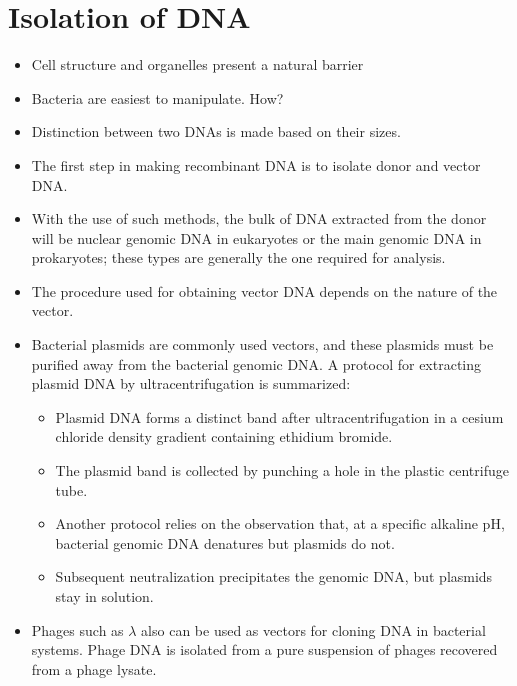 \documentclass[11pt,dvipsnames,ignorenonframetext,aspectratio=169]{beamer}
\providecommand{\tightlist}{%
  \setlength{\itemsep}{0pt}\setlength{\parskip}{0pt}}
\begin{document}
\hypertarget{isolation-of-dna}{%
\section{Isolation of DNA}\label{isolation-of-dna}}

\begin{frame}{}
\protect\hypertarget{section-6}{}
\begin{itemize}
\tightlist
\item
  Cell structure and organelles present a natural barrier
\item
  Bacteria are easiest to manipulate. How?
\item
  Distinction between two DNAs is made based on their sizes.
\item
  The first step in making recombinant DNA is to isolate donor and
  vector DNA.
\item
  With the use of such methods, the bulk of DNA extracted from the donor
  will be nuclear genomic DNA in eukaryotes or the main genomic DNA in
  prokaryotes; these types are generally the one required for analysis.
\end{itemize}
\end{frame}

\begin{frame}{}
\protect\hypertarget{section-7}{}
\begin{itemize}
\tightlist
\item
  The procedure used for obtaining vector DNA depends on the nature of
  the vector.
\item
  Bacterial plasmids are commonly used vectors, and these plasmids must
  be purified away from the bacterial genomic DNA. A protocol for
  extracting plasmid DNA by ultracentrifugation is summarized:

  \begin{itemize}
  \tightlist
  \item
    Plasmid DNA forms a distinct band after ultracentrifugation in a
    cesium chloride density gradient containing ethidium bromide.
  \item
    The plasmid band is collected by punching a hole in the plastic
    centrifuge tube.
  \item
    Another protocol relies on the observation that, at a specific
    alkaline pH, bacterial genomic DNA denatures but plasmids do not.
  \item
    Subsequent neutralization precipitates the genomic DNA, but plasmids
    stay in solution.
  \end{itemize}
\item
  Phages such as \(\lambda\) also can be used as vectors for cloning DNA
  in bacterial systems. Phage DNA is isolated from a pure suspension of
  phages recovered from a phage lysate.
\end{itemize}
\end{frame}
\end{document}
